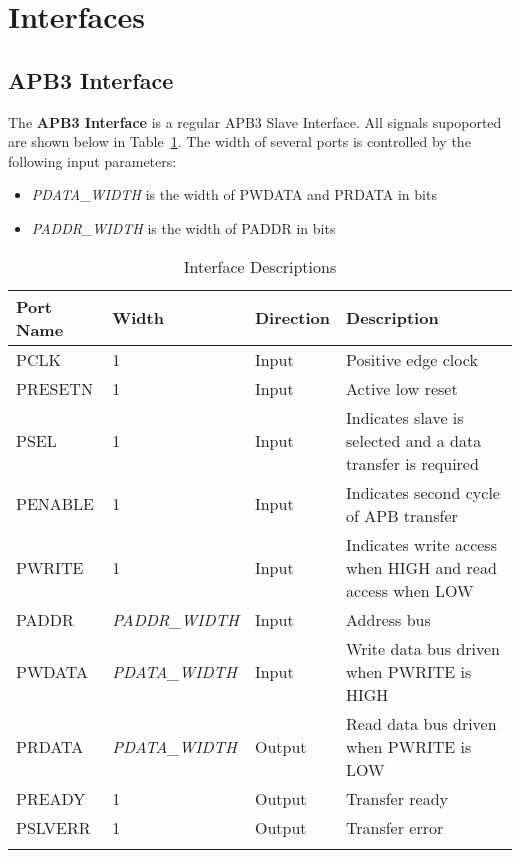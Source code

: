 \section{Interfaces}

\subsection{APB3 Interface}
The \textbf{APB3 Interface} is a regular APB3 Slave Interface. All signals supoported are shown below in 
Table~\ref{table:interface}. The width of several ports is controlled 
by the following input parameters:

\begin{itemize}[noitemsep]
  \item \textit{PDATA_WIDTH} is the width of PWDATA and PRDATA in bits
  \item \textit{PADDR_WIDTH} is the width of PADDR in bits
\end{itemize}
 
\renewcommand*{\arraystretch}{1.4}
\begin{longtable}[H]{
  | p{}
  | p{}
  | p{}
  | p{} |
  }
  \hline
  \textbf{Port Name} &   
  \textbf{Width} &   
  \textbf{Direction} &   
  \textbf{Description} \\ \hline \hline

  PCLK &       
  1 &       
  Input &       
  Positive edge clock \\ \hline

  PRESETN &       
  1 &       
  Input &       
  Active low reset \\ \hline

  PSEL &       
  1 & 
  Input &       
  Indicates slave is selected and a data transfer is required \\ \hline

  PENABLE &        
  1 & 
  Input &       
  Indicates second cycle of APB transfer \\ \hline

  PWRITE &        
  1 & 
  Input &       
  Indicates write access when HIGH and read access when LOW\\ \hline

  PADDR &      
  \textit{PADDR_WIDTH} & 
  Input &     
  Address bus \\ \hline

  PWDATA &      
  \textit{PDATA_WIDTH} & 
  Input &     
  Write data bus driven when PWRITE is HIGH\\ \hline

  PRDATA &      
  \textit{PDATA_WIDTH} & 
  Output &     
  Read data bus driven when PWRITE is LOW\\ \hline
 
  PREADY &        
  1 & 
  Output &       
  Transfer ready \\ \hline

  PSLVERR &        
  1 & 
  Output &       
  Transfer error \\ \hline

  \caption{Interface Descriptions}\label{table:interface}
\end{longtable}
